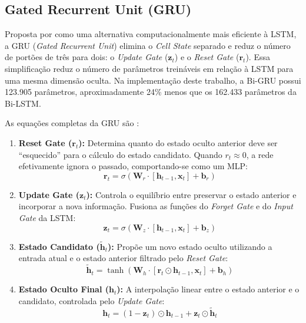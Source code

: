 \subsection{Gated Recurrent Unit (GRU)}
Proposta por \cite{cho2014learning} como uma alternativa computacionalmente mais eficiente à LSTM, a GRU (\textit{Gated Recurrent Unit}) elimina o \textit{Cell State} separado e reduz o número de portões de três para dois: o \textit{Update Gate} ($\mathbf{z}_t$) e o \textit{Reset Gate} ($\mathbf{r}_t$). Essa simplificação reduz o número de parâmetros treináveis em relação à LSTM para uma mesma dimensão oculta. Na implementação deste trabalho, a Bi-GRU possui 123.905 parâmetros, aproximadamente 24\% menos que os 162.433 parâmetros da Bi-LSTM.

As equações completas da GRU são \cite{cho2014learning, brownlee2018machine}:
\begin{enumerate}
    \item \textbf{Reset Gate ($\mathbf{r}_t$):} Determina quanto do estado oculto anterior deve ser ``esquecido'' para o cálculo do estado candidato. Quando $r_t \approx 0$, a rede efetivamente ignora o passado, comportando-se como um MLP:
    \begin{equation}
        \mathbf{r}_t = \sigma(\mathbf{W}_r \cdot [\mathbf{h}_{t-1}, \mathbf{x}_t] + \mathbf{b}_r)
    \end{equation}

    \item \textbf{Update Gate ($\mathbf{z}_t$):} Controla o equilíbrio entre preservar o estado anterior e incorporar a nova informação. Fusiona as funções do \textit{Forget Gate} e do \textit{Input Gate} da LSTM:
    \begin{equation}
        \mathbf{z}_t = \sigma(\mathbf{W}_z \cdot [\mathbf{h}_{t-1}, \mathbf{x}_t] + \mathbf{b}_z)
    \end{equation}

    \item \textbf{Estado Candidato ($\tilde{\mathbf{h}}_t$):} Propõe um novo estado oculto utilizando a entrada atual e o estado anterior filtrado pelo \textit{Reset Gate}:
    \begin{equation}
        \tilde{\mathbf{h}}_t = \tanh(\mathbf{W}_h \cdot [\mathbf{r}_t \odot \mathbf{h}_{t-1}, \mathbf{x}_t] + \mathbf{b}_h)
    \end{equation}

    \item \textbf{Estado Oculto Final ($\mathbf{h}_t$):} A interpolação linear entre o estado anterior e o candidato, controlada pelo \textit{Update Gate}:
    \begin{equation}
        \mathbf{h}_t = (1 - \mathbf{z}_t) \odot \mathbf{h}_{t-1} + \mathbf{z}_t \odot \tilde{\mathbf{h}}_t
    \end{equation}
\end{enumerate}

